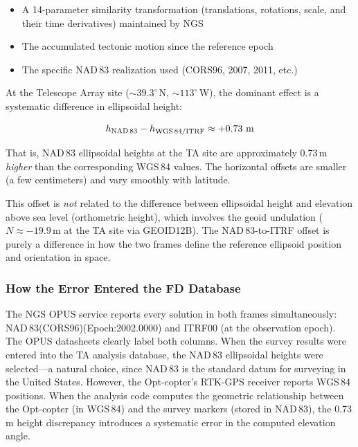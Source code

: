 \documentclass[11pt,letterpaper]{article}
\newcommand{\degree}{^\circ}
\begin{document}
\begin{itemize}[nosep]
    \item A 14-parameter similarity transformation (translations, rotations, scale, and their time derivatives) maintained by NGS~\cite{soler2004}
    \item The accumulated tectonic motion since the reference epoch
    \item The specific NAD\,83 realization used (CORS96, 2007, 2011, etc.)
\end{itemize}

\noindent At the Telescope Array site ($\sim\!39.3\degree$\,N, $\sim\!113\degree$\,W), the dominant effect is a systematic difference in ellipsoidal height:

\begin{equation}
h_{\text{NAD\,83}} - h_{\text{WGS\,84/ITRF}} \approx +0.73~\text{m}
\label{eq:frame_offset}
\end{equation}

\noindent That is, NAD\,83 ellipsoidal heights at the TA site are approximately 0.73\,m \emph{higher} than the corresponding WGS\,84 values. The horizontal offsets are smaller (a few centimeters) and vary smoothly with latitude.

This offset is \emph{not} related to the difference between ellipsoidal height and elevation above sea level (orthometric height), which involves the geoid undulation ($N \approx -19.9$\,m at the TA site via GEOID12B). The NAD\,83-to-ITRF offset is purely a difference in how the two frames define the reference ellipsoid position and orientation in space.

\subsubsection{How the Error Entered the FD Database}

The NGS OPUS service reports every solution in both frames simultaneously: NAD\,83(CORS96)(Epoch:2002.0000) and ITRF00 (at the observation epoch). The OPUS datasheets clearly label both columns. When the survey results were entered into the TA analysis database, the NAD\,83 ellipsoidal heights were selected---a natural choice, since NAD\,83 is the standard datum for surveying in the United States. However, the Opt-copter's RTK-GPS receiver reports WGS\,84 positions. When the analysis code computes the geometric relationship between the Opt-copter (in WGS\,84) and the survey markers (stored in NAD\,83), the 0.73\,m height discrepancy introduces a systematic error in the computed elevation angle.
\end{document}
